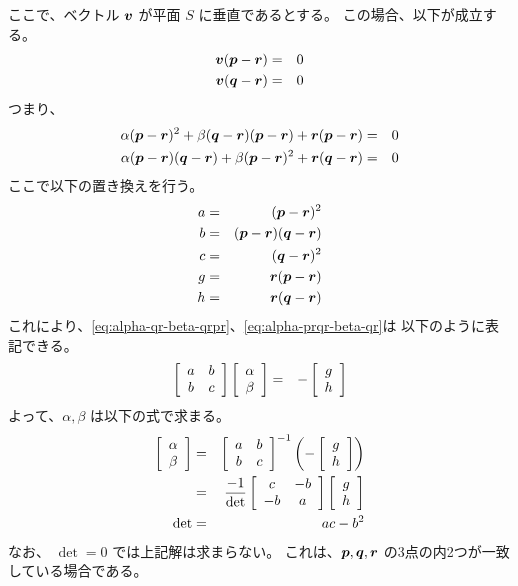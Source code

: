 \documentclass[11pt,a4j]{jarticle}
\begin{document}
ここで、ベクトル ${\bm{v}}$ が平面 $S$ に垂直であるとする。
この場合、以下が成立する。
  \begin{eqnarray}
    {\bm{v}} ({\bm{p}} - {\bm{r}}) & = & 0
  \\
    {\bm{v}} ({\bm{q}} - {\bm{r}}) & = & 0
  \end{eqnarray}
つまり、
  \begin{eqnarray}
      \alpha ({\bm{p}} - {\bm{r}})^2
    + \beta  ({\bm{q}} - {\bm{r}}) ({\bm{p}} - {\bm{r}})
    + {\bm{r}} ({\bm{p}} - {\bm{r}})
      & = & 0
  \label{eq:alpha-qr-beta-qrpr}
  \\
      \alpha ({\bm{p}} - {\bm{r}}) ({\bm{q}} - {\bm{r}})
    + \beta  ({\bm{p}} - {\bm{r}})^2
    + {\bm{r}} ({\bm{q}} - {\bm{r}})
      & = & 0
  \label{eq:alpha-prqr-beta-qr}
  \end{eqnarray}
ここで以下の置き換えを行う。
  \begin{eqnarray}
    a & = & ({\bm{p}} - {\bm{r}})^2
  \\
    b & = & ({\bm{p}} - {\bm{r}}) ({\bm{q}} - {\bm{r}})
  \\
    c & = & ({\bm{q}} - {\bm{r}})^2
  \\
    g & = & {\bm{r}} ({\bm{p}} - {\bm{r}})
  \\
    h & = & {\bm{r}} ({\bm{q}} - {\bm{r}})
  \end{eqnarray}
これにより、\eqref{eq:alpha-qr-beta-qrpr}、\eqref{eq:alpha-prqr-beta-qr}は
以下のように表記できる。
  \begin{eqnarray}
    \left[ \begin{array}[c]{cc} a & b \\ b & c \end{array} \right] \left[ \begin{array}[c]{c} \alpha \\ \beta \end{array} \right]
      & = &
        -\left[ \begin{array}[c]{c} g \\ h \end{array} \right]
  \end{eqnarray}
よって、$\alpha, \beta$ は以下の式で求まる。
  \begin{eqnarray}
    \left[ \begin{array}[c]{c} \alpha \\ \beta \end{array} \right]
      & = &
        \left[ \begin{array}[c]{cc} a & b \\ b & c \end{array} \right]^{-1} 
        \left( -\left[ \begin{array}[c]{c} g \\ h \end{array} \right] \right)
  \\
      & = &
        \frac{-1}{\det} \left[ \begin{array}[c]{cc} c & -b \\ -b & a \end{array} \right]
        \left[ \begin{array}[c]{c} g \\ h \end{array} \right]
  \\
    \det
      & = &
        ac - b^2
  \end{eqnarray}
なお、 $\det = 0$ では上記解は求まらない。
これは、${\bm{p}},{\bm{q}},{\bm{r}}$ の3点の内2つが一致している場合である。
\end{document}
